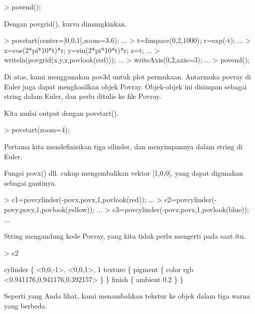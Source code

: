 \documentclass{report}
\begin{document}
\begin{eulernotebook}
\begin{eulercomment}
\begin{eulercomment}
\begin{eulerprompt}
> povend();
\end{eulerprompt}
\begin{eulercomment}
Dengan povgrid(), kurva dimungkinkan.
\end{eulercomment}
\begin{eulerprompt}
> povstart(center=[0,0,1],zoom=3.6); ...
> t=linspace(0,2,1000); r=exp(-t); ...
> x=cos(2*pi*10*t)*r; y=sin(2*pi*10*t)*r; z=t; ...
> writeln(povgrid(x,y,z,povlook(red))); ...
> writeAxis(0,2,axis=3); ...
> povend();
\end{eulerprompt}
\begin{eulercomment}
Di atas, kami menggunakan pov3d untuk plot permukaan. Antarmuka povray
di Euler juga dapat menghasilkan objek Povray. Objek-objek ini
disimpan sebagai string dalam Euler, dan perlu ditulis ke file Povray.

Kita mulai output dengan povstart().
\end{eulercomment}
\begin{eulerprompt}
> povstart(zoom=4);
\end{eulerprompt}
\begin{eulercomment}
Pertama kita mendefinisikan tiga silinder, dan menyimpannya dalam
string di Euler.

Fungsi povx() dll. cukup mengembalikan vektor [1,0,0], yang dapat
digunakan sebagai gantinya.
\end{eulercomment}
\begin{eulerprompt}
> c1=povcylinder(-povx,povx,1,povlook(red)); ...
> c2=povcylinder(-povy,povy,1,povlook(yellow)); ...
> c3=povcylinder(-povz,povz,1,povlook(blue)); ...
\end{eulerprompt}
\begin{eulercomment}
String mengandung kode Povray, yang kita tidak perlu mengerti pada
saat itu.
\end{eulercomment}
\begin{eulerprompt}
> c2
\end{eulerprompt}
\begin{euleroutput}
  cylinder \{ <0,0,-1>, <0,0,1>, 1
   texture \{ pigment \{ color rgb <0.941176,0.941176,0.392157> \}  \} 
   finish \{ ambient 0.2 \} 
   \}
\end{euleroutput}
\begin{eulercomment}
Seperti yang Anda lihat, kami menambahkan tekstur ke objek dalam tiga
warna yang berbeda.


\end{eulercomment}
\end{eulercomment}
\end{eulercomment}
\end{eulernotebook}
\end{document}
